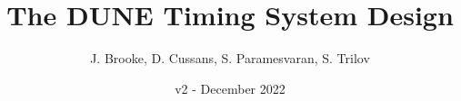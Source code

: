 \documentclass{dune}
\title{The DUNE Timing System  Design}
\author{J. Brooke, D. Cussans, S. Paramesvaran, S. Trilov}
\date{v2 - December 2022}
\begin{document}
\linenumbers
\maketitle

\tableofcontents



\printglossary
\printbibliography
\end{document}
